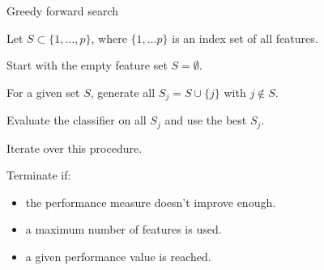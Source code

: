 \documentclass[11pt,compress,t,notes=noshow, xcolor=table]{beamer}
\begin{document}
  
  \begin{vbframe}{Greedy forward search}

    \begin{blocki}{}
      \item Let $S \subset \{1, \dots, p \}$, where $\{1, \dots p \}$ is an index set of all features.
      \item Start with the empty feature set $S = \emptyset$.
      \item For a given set $S$, generate all $S_j = S \cup \{j\}$ with $j \notin S$.
      \item Evaluate the classifier on all $S_j$ and use the best $S_j$.
      \item Iterate over this procedure.
      \item Terminate if:
        \begin{itemize}
          \item the performance measure doesn't improve enough.
          \item a maximum number of features is used.
          \item a given performance value is reached.
        \end{itemize}
    \end{blocki}

    \end{vbframe}
\end{document}
